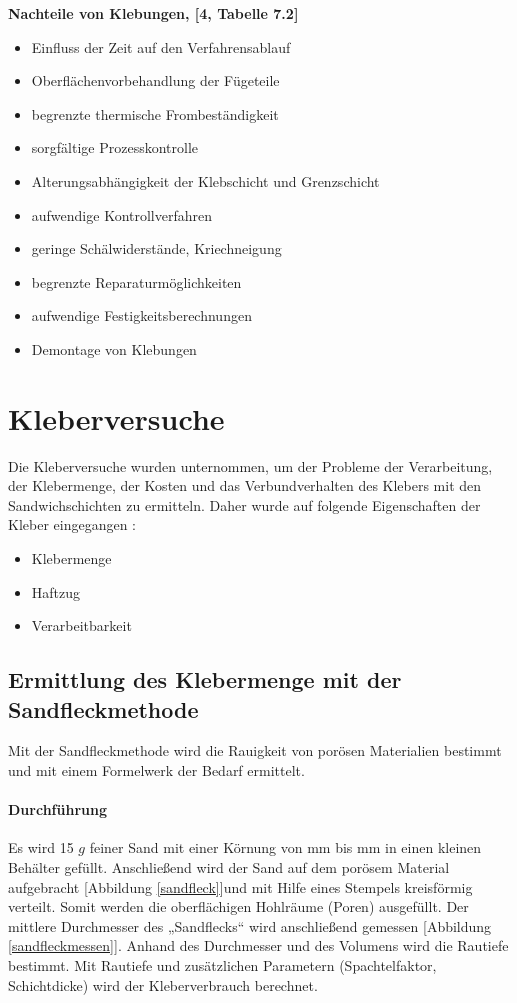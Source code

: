 \textbf{Nachteile von Klebungen, [4, Tabelle 7.2]}

\begin{itemize}
	\item Einfluss der Zeit auf den Verfahrensablauf
	\item Oberflächenvorbehandlung der Fügeteile
	\item begrenzte thermische Frombeständigkeit
	\item sorgfältige Prozesskontrolle
	\item Alterungsabhängigkeit der Klebschicht und Grenzschicht
	\item aufwendige Kontrollverfahren
	\item geringe Schälwiderstände, Kriechneigung
	\item begrenzte Reparaturmöglichkeiten
	\item aufwendige Festigkeitsberechnungen
	\item Demontage von Klebungen
	\end{itemize}


\section{Kleberversuche}

Die Kleberversuche wurden unternommen, um der Probleme der Verarbeitung, der Klebermenge, der Kosten und das Verbundverhalten des Klebers mit den Sandwichschichten zu ermitteln.\newline
Daher wurde auf folgende Eigenschaften der Kleber eingegangen :	

\begin{itemize}
	\item Klebermenge
	\item Haftzug
	\item Verarbeitbarkeit
	\end{itemize}




\subsection{Ermittlung des Klebermenge mit der Sandfleckmethode}

Mit der Sandfleckmethode wird die Rauigkeit von porösen Materialien bestimmt  
und mit einem Formelwerk der Bedarf ermittelt.

\paragraph{Durchführung}
Es wird 15 $g$ feiner Sand mit einer Körnung von \unit[0,1]{mm} bis \unit[0,2]{mm}  in einen kleinen Behälter gefüllt. Anschließend wird der Sand auf dem porösem Material aufgebracht [Abbildung \ref{sandfleck}]und mit Hilfe eines Stempels kreisförmig verteilt. Somit werden die oberflächigen Hohlräume (Poren) ausgefüllt. Der mittlere Durchmesser des „Sandflecks“ wird anschließend gemessen [Abbildung \ref{sandfleckmessen}]. Anhand des Durchmesser und des Volumens wird die Rautiefe bestimmt. Mit Rautiefe und zusätzlichen Parametern (Spachtelfaktor, Schichtdicke) wird der Kleberverbrauch berechnet.


